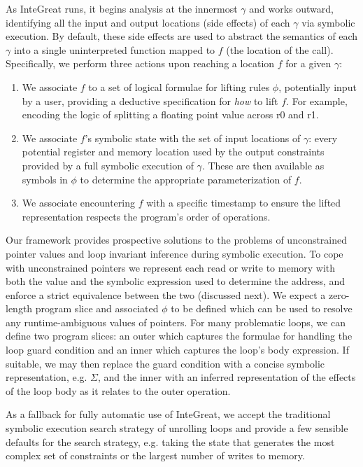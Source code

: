 As InteGreat runs, it begins analysis at the innermost $\gamma$ and works outward, identifying all the input and output locations (side effects) of each $\gamma$ via symbolic execution.
By default, these side effects are used to abstract the semantics of each $\gamma$ into a single uninterpreted function mapped to $f$ (the location of the call).
Specifically, we perform three actions upon reaching a location $f$ for a given $\gamma$:
\begin{enumerate}
	\item We associate $f$ to a set of logical formulae for lifting rules
	$\phi$, potentially input by a user, providing a deductive
	specification for \emph{how} to lift $f$. For example, encoding the
	logic of splitting a floating point value across r0 and r1.
	\item We associate $f$'s symbolic state with the set of input locations
	of $\gamma$: every potential register and memory location used by the
	output constraints provided by a full symbolic execution of $\gamma$.
	These are then available as symbols in $\phi$ to determine the
	appropriate parameterization of $f$.
	\item We associate encountering $f$ with a specific timestamp to ensure
	the lifted representation respects the program's order of operations.
\end{enumerate}

Our framework provides prospective solutions to the problems of unconstrained pointer values and loop invariant inference during symbolic execution.
To cope with unconstrained pointers we represent each read or write to memory with both the value and the symbolic expression used to determine the address, and enforce a strict equivalence between the two (discussed next).
We expect a zero-length program slice and associated $\phi$ to be defined which can be used to resolve any runtime-ambiguous values of pointers.
For many problematic loops, we can define two program slices: an outer which captures the formulae for handling the loop guard condition and an inner which captures the loop's body expression.
If suitable, we may then replace the guard condition with a concise symbolic representation, e.g. $\Sigma$, and the inner with an inferred representation of the effects of the loop body as it relates to the outer operation.

As a fallback for fully automatic use of InteGreat, we accept the traditional symbolic execution search strategy of unrolling loops and provide a few sensible defaults for the search strategy, e.g. taking the state that generates the most complex set of constraints or the largest number of writes to memory.

